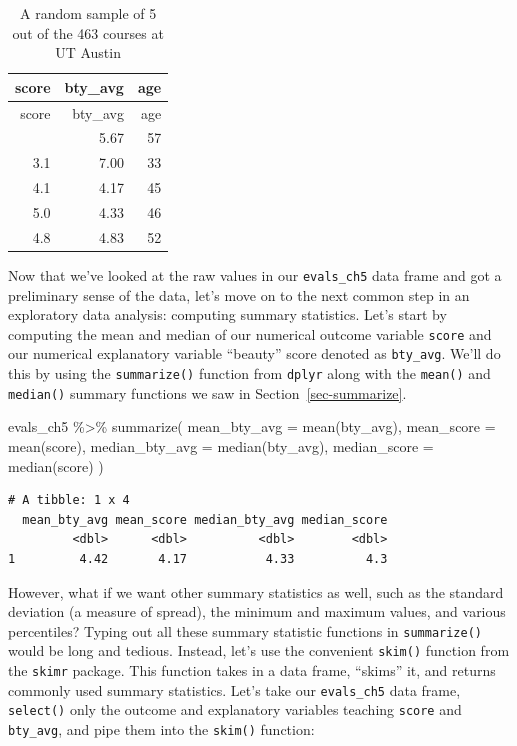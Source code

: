 \documentclass[
  letterpaper,
  DIV=11,
  numbers=noendperiod]{scrreprt}
\newenvironment{Shaded}{\begin{snugshade}}{\end{snugshade}}
\newcommand{\AttributeTok}[1]{\textcolor[rgb]{0.40,0.45,0.13}{#1}}
\newcommand{\FunctionTok}[1]{\textcolor[rgb]{0.28,0.35,0.67}{#1}}
\newcommand{\NormalTok}[1]{\textcolor[rgb]{0.00,0.23,0.31}{#1}}
\newcommand{\SpecialCharTok}[1]{\textcolor[rgb]{0.37,0.37,0.37}{#1}}
\theoremstyle{definition}
\theoremstyle{remark}
\begin{document}
\hypertarget{tbl-five-random-courses}{}
\begin{longtable}[]{@{}rrr@{}}
\caption{\label{tbl-five-random-courses}A random sample of 5 out of the
463 courses at UT Austin}\tabularnewline
\toprule\noalign{}
score & bty\_avg & age \\
\midrule\noalign{}
\endfirsthead
\toprule\noalign{}
score & bty\_avg & age \\
\midrule\noalign{}
\endhead
\bottomrule\noalign{}
\endlastfoot
4.4 & 5.67 & 57 \\
3.1 & 7.00 & 33 \\
4.1 & 4.17 & 45 \\
5.0 & 4.33 & 46 \\
4.8 & 4.83 & 52 \\
\end{longtable}

Now that we've looked at the raw values in our \texttt{evals\_ch5} data
frame and got a preliminary sense of the data, let's move on to the next
common step in an exploratory data analysis: computing summary
statistics. Let's start by computing the mean and median of our
numerical outcome variable \texttt{score} and our numerical explanatory
variable ``beauty'' score denoted as \texttt{bty\_avg}. We'll do this by
using the \texttt{summarize()} function from \texttt{dplyr} along with
the \texttt{mean()} and \texttt{median()} summary functions we saw in
Section~\ref{sec-summarize}.

\begin{Shaded}
\begin{Highlighting}[]
\NormalTok{evals\_ch5 }\SpecialCharTok{\%\textgreater{}\%}
  \FunctionTok{summarize}\NormalTok{(}
    \AttributeTok{mean\_bty\_avg =} \FunctionTok{mean}\NormalTok{(bty\_avg),}
    \AttributeTok{mean\_score =} \FunctionTok{mean}\NormalTok{(score),}
    \AttributeTok{median\_bty\_avg =} \FunctionTok{median}\NormalTok{(bty\_avg), }
    \AttributeTok{median\_score =} \FunctionTok{median}\NormalTok{(score)}
\NormalTok{    )}
\end{Highlighting}
\end{Shaded}

\begin{verbatim}
# A tibble: 1 x 4
  mean_bty_avg mean_score median_bty_avg median_score
         <dbl>      <dbl>          <dbl>        <dbl>
1         4.42       4.17           4.33          4.3
\end{verbatim}

However, what if we want other summary statistics as well, such as the
standard deviation (a measure of spread), the minimum and maximum
values, and various percentiles? Typing out all these summary statistic
functions in \texttt{summarize()} would be long and tedious. Instead,
let's use the convenient \texttt{skim()} function from the
\texttt{skimr} package. This function takes in a data frame, ``skims''
it, and returns commonly used summary statistics. Let's take our
\texttt{evals\_ch5} data frame, \texttt{select()} only the outcome and
explanatory variables teaching \texttt{score} and \texttt{bty\_avg}, and
pipe them into the \texttt{skim()} function:
\end{document}
